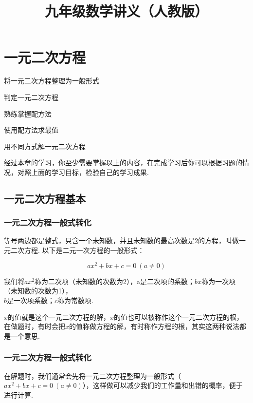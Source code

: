\documentclass[lang=cn, 10pt, titlestyle=hang]{elegantbook}
\title{九年级数学讲义（人教版）}
\begin{document}
\tableofcontents

\chapter{一元二次方程}



\begin{introduction}[本章学习目标]

\item 将一元二次方程整理为一般形式
\item 判定一元二次方程
\item 熟练掌握配方法
\item 使用配方法求最值
\item 用不同方式解一元二次方程

\end{introduction}

经过本章的学习，你至少需要掌握以上的内容，在完成学习后你可以根据习题的情况，对照上面的学习目标，检验自己的学习成果.

\section{一元二次方程基本}
\subsection{一元二次方程一般式转化}
等号两边都是整式，只含一个未知数，并且未知数的最高次数是2的方程，叫做一元二次方程. 以下是二元一次方程的一般形式：

$$
ax^2 + bx + c = 0 \ (a \neq 0)
$$



我们将$ax^2$称为二次项（未知数的次数为2），a是二次项的系数；$bx$称为一次项（未知数的次数为1），\\ $b$是一次项系数；$c$称为常数项.



$x$的值就是这个一元二次方程的解，$x$的值也可以被称作这个一元二次方程的根，在做题时，有时会把$x$的值称做方程的解，有时称作方程的根，其实这两种说法都是一个意思.

\subsection{一元二次方程一般式转化}

在解题时，我们通常会先将一元二次方程整理为一般形式（$
ax^2 + bx + c = 0 \ (a \neq 0)
$），这样做可以减少我们的工作量和出错的概率，便于进行计算.
\end{document}
